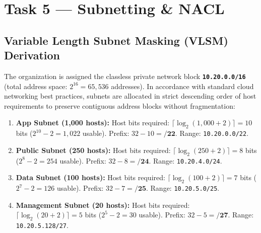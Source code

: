 \documentclass[10pt,a4paper]{article}
\begin{document}
\vspace{0.25cm}

\section{Task 5 --- Subnetting \& NACL}

\subsection{Variable Length Subnet Masking (VLSM) Derivation}
The organization is assigned the classless private network block \textbf{\texttt{10.20.0.0/16}} (total address space: $2^{16} = 65,536$ addresses). In accordance with standard cloud networking best practices, subnets are allocated in strict descending order of host requirements to preserve contiguous address blocks without fragmentation:
\begin{enumerate}[noitemsep,topsep=2pt,leftmargin=*]
    \item \textbf{App Subnet (1,000 hosts):} Host bits required: $\lceil \log_2(1,000 + 2) \rceil = 10$ bits ($2^{10} - 2 = 1,022$ usable). Prefix: $32 - 10 = \mathbf{/22}$. Range: \texttt{10.20.0.0/22}.
    \item \textbf{Public Subnet (250 hosts):} Host bits required: $\lceil \log_2(250 + 2) \rceil = 8$ bits ($2^8 - 2 = 254$ usable). Prefix: $32 - 8 = \mathbf{/24}$. Range: \texttt{10.20.4.0/24}.
    \item \textbf{Data Subnet (100 hosts):} Host bits required: $\lceil \log_2(100 + 2) \rceil = 7$ bits ($2^7 - 2 = 126$ usable). Prefix: $32 - 7 = \mathbf{/25}$. Range: \texttt{10.20.5.0/25}.
    \item \textbf{Management Subnet (20 hosts):} Host bits required: $\lceil \log_2(20 + 2) \rceil = 5$ bits ($2^5 - 2 = 30$ usable). Prefix: $32 - 5 = \mathbf{/27}$. Range: \texttt{10.20.5.128/27}.
\end{enumerate}
\end{document}

